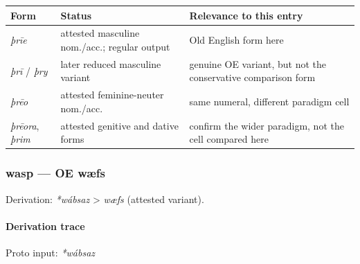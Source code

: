 \documentclass[
  british,
  a4paper,
]{article}
\newcounter{none} %
\begin{document}
{\def\LTcaptype{none} %
\begin{longtable}[]{@{}
  >{\raggedright\arraybackslash}p{}
  >{\raggedright\arraybackslash}p{}
  >{\raggedright\arraybackslash}p{}@{}}
\toprule\noalign{}
\begin{minipage}[b]{\linewidth}\raggedright
Form
\end{minipage} & \begin{minipage}[b]{\linewidth}\raggedright
Status
\end{minipage} & \begin{minipage}[b]{\linewidth}\raggedright
Relevance to this entry
\end{minipage} \\
\midrule\noalign{}
\endhead
\bottomrule\noalign{}
\endlastfoot
\emph{þrīe} & attested masculine nom./acc.; regular output & Old English
form here \\
\emph{þrī} / \emph{þry} & later reduced masculine variant & genuine OE
variant, but not the conservative comparison form \\
\emph{þrēo} & attested feminine-neuter nom./acc. & same numeral,
different paradigm cell \\
\emph{þrēora}, \emph{þrim} & attested genitive and dative forms &
confirm the wider paradigm, not the cell compared here \\
\end{longtable}
}

\subsubsection{wasp --- OE wæfs}\label{wasp-oe-wuxe6fs}

Derivation: \emph{*wábsaz} \textgreater{} \emph{wæfs} (attested
variant).

\paragraph{Derivation trace}\label{derivation-trace-3}

Proto input: \emph{*wábsaz}

\begingroup
\setlength{\fboxsep}{6pt}
\end{document}
